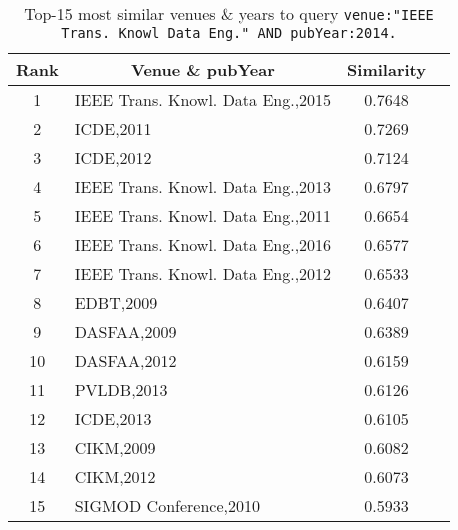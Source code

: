 \begin{table}[t]
\small
\cprotect\caption {Top-15 most similar venues \& years to query \verb|venue:"IEEE Trans. Knowl Data Eng." AND pubYear:2014.|}\label{tbl:similarVenue}	
		\begin{tabular}{|c|l|c|c|}
			\hline
				\textbf{Rank} & \multicolumn{1}{c|}{\textbf{Venue \& pubYear}} & \multicolumn{1}{c|}{\textbf{Similarity}} \\ \hline
				1             & IEEE Trans. Knowl. Data Eng.,2015              & 0.7648                                   \\ \hline
				2             & ICDE,2011                                      & 0.7269                                   \\ \hline
				3             & ICDE,2012                                      & 0.7124                                   \\ \hline
				4             & IEEE Trans. Knowl. Data Eng.,2013              & 0.6797                                   \\ \hline
				5             & IEEE Trans. Knowl. Data Eng.,2011              & 0.6654                                   \\ \hline
				6             & IEEE Trans. Knowl. Data Eng.,2016              & 0.6577                                   \\ \hline
				7             & IEEE Trans. Knowl. Data Eng.,2012              & 0.6533                                   \\ \hline
				8             & EDBT,2009                                      & 0.6407                                   \\ \hline
				9             & DASFAA,2009                                    & 0.6389                                   \\ \hline
				10            & DASFAA,2012                                    & 0.6159                                   \\ \hline
				11            & PVLDB,2013                                     & 0.6126                                   \\ \hline
				12            & ICDE,2013                                      & 0.6105                                   \\ \hline
				13            & CIKM,2009                                      & 0.6082                                   \\ \hline
				14            & CIKM,2012                                      & 0.6073                                   \\ \hline
				15            & SIGMOD Conference,2010                         & 0.5933                                   \\ \hline
		\end{tabular}%
\end{table}

